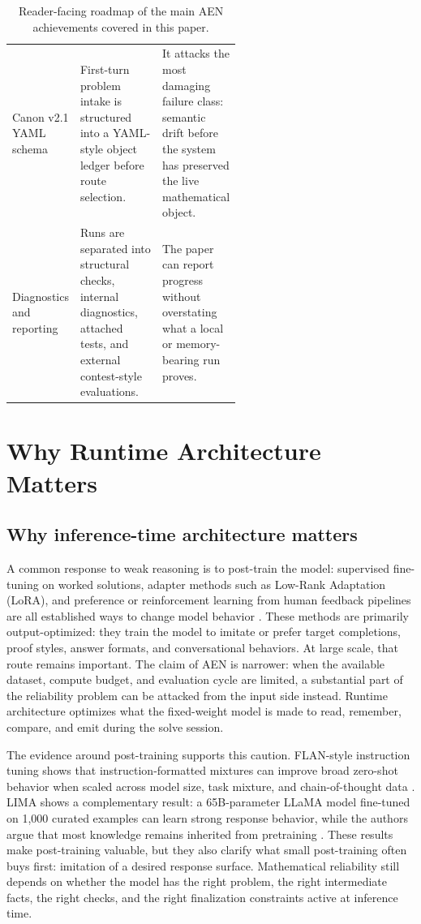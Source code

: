 \documentclass[11pt]{article}
\begin{document}
\begin{table}[p]
\begin{tabularx}{\textwidth}{@{}>{\raggedright\arraybackslash}p{0.20\linewidth}>{\raggedright\arraybackslash}p{0.36\linewidth}>{\raggedright\arraybackslash}X@{}}
Canon v2.1 YAML schema & First-turn problem intake is structured into a YAML-style object ledger before route selection. & It attacks the most damaging failure class: semantic drift before the system has preserved the live mathematical object. \\
Diagnostics and reporting & Runs are separated into structural checks, internal diagnostics, attached tests, and external contest-style evaluations. & The paper can report progress without overstating what a local or memory-bearing run proves. \\
\bottomrule
\end{tabularx}
\caption{Reader-facing roadmap of the main AEN achievements covered in this paper.}
\label{tab:contribution-roadmap}
\end{table}

\section{Why Runtime Architecture Matters}

\subsection{Why inference-time architecture matters}

A common response to weak reasoning is to post-train the model: supervised fine-tuning on worked solutions, adapter methods such as Low-Rank Adaptation (LoRA), and preference or reinforcement learning from human feedback pipelines are all established ways to change model behavior \citep{hu2021lora,christiano2017deep,ouyang2022training}. These methods are primarily output-optimized: they train the model to imitate or prefer target completions, proof styles, answer formats, and conversational behaviors. At large scale, that route remains important. The claim of AEN is narrower: when the available dataset, compute budget, and evaluation cycle are limited, a substantial part of the reliability problem can be attacked from the input side instead. Runtime architecture optimizes what the fixed-weight model is made to read, remember, compare, and emit during the solve session.

The evidence around post-training supports this caution. FLAN-style instruction tuning shows that instruction-formatted mixtures can improve broad zero-shot behavior when scaled across model size, task mixture, and chain-of-thought data \citep{wei2021finetuned,chung2022scaling,longpre2023flan}. LIMA shows a complementary result: a 65B-parameter LLaMA model fine-tuned on 1,000 curated examples can learn strong response behavior, while the authors argue that most knowledge remains inherited from pretraining \citep{zhou2023lima}. These results make post-training valuable, but they also clarify what small post-training often buys first: imitation of a desired response surface. Mathematical reliability still depends on whether the model has the right problem, the right intermediate facts, the right checks, and the right finalization constraints active at inference time.
\end{document}
